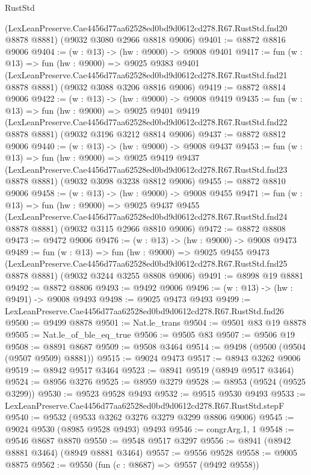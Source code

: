 \begin{lexlean}{RustStd}
\begin{coremodule}
    (LexLeanPreserve.Cae4456d77aa62528ed0bd9d0612cd278.R67.RustStd.fnd20 @8878 @8881)
    (@9032 @3080 @2966 @8818 @9006)
@9401 := @8872 @8816 @9006
@9404 := (w : @13) -> (hw : @9000) -> @9008 @9401
@9417 := fun (w : @13) =>
  fun (hw : @9000) =>
  @9025
    @9383
    @9401
    (LexLeanPreserve.Cae4456d77aa62528ed0bd9d0612cd278.R67.RustStd.fnd21 @8878 @8881)
    (@9032 @3088 @3206 @8816 @9006)
@9419 := @8872 @8814 @9006
@9422 := (w : @13) -> (hw : @9000) -> @9008 @9419
@9435 := fun (w : @13) =>
  fun (hw : @9000) =>
  @9025
    @9401
    @9419
    (LexLeanPreserve.Cae4456d77aa62528ed0bd9d0612cd278.R67.RustStd.fnd22 @8878 @8881)
    (@9032 @3196 @3212 @8814 @9006)
@9437 := @8872 @8812 @9006
@9440 := (w : @13) -> (hw : @9000) -> @9008 @9437
@9453 := fun (w : @13) =>
  fun (hw : @9000) =>
  @9025
    @9419
    @9437
    (LexLeanPreserve.Cae4456d77aa62528ed0bd9d0612cd278.R67.RustStd.fnd23 @8878 @8881)
    (@9032 @3098 @3238 @8812 @9006)
@9455 := @8872 @8810 @9006
@9458 := (w : @13) -> (hw : @9000) -> @9008 @9455
@9471 := fun (w : @13) =>
  fun (hw : @9000) =>
  @9025
    @9437
    @9455
    (LexLeanPreserve.Cae4456d77aa62528ed0bd9d0612cd278.R67.RustStd.fnd24 @8878 @8881)
    (@9032 @3115 @2966 @8810 @9006)
@9472 := @8872 @8808
@9473 := @9472 @9006
@9476 := (w : @13) -> (hw : @9000) -> @9008 @9473
@9489 := fun (w : @13) =>
  fun (hw : @9000) =>
  @9025
    @9455
    @9473
    (LexLeanPreserve.Cae4456d77aa62528ed0bd9d0612cd278.R67.RustStd.fnd25 @8878 @8881)
    (@9032 @3244 @3255 @8808 @9006)
@9491 := @8998 @19 @8881
@9492 := @8872 @8806
@9493 := @9492 @9006
@9496 := (w : @13) -> (hw : @9491) -> @9008 @9493
@9498 := @9025 @9473 @9493
@9499 := LexLeanPreserve.Cae4456d77aa62528ed0bd9d0612cd278.R67.RustStd.fnd26
@9500 := @9499 @8878
@9501 := Nat.le_trans
@9504 := @9501 @83 @19 @8878
@9505 := Nat.le_of_ble_eq_true
@9506 := @9505 @83
@9507 := @9506 @19
@9508 := @8891 @8687
@9509 := @9508 @3464
@9514 := @9498 (@9500 (@9504 (@9507 @9509) @8881))
@9515 := @9024 @9473
@9517 := @8943 @3262 @9006
@9519 := @8942 @9517 @3464
@9523 := @8941 @9519 (@8949 @9517 @3464)
@9524 := @8956 @3276
@9525 := @8959 @3279
@9528 := @8953 (@9524 (@9525 @3299))
@9530 := @9523 @9528 @9493
@9532 := @9515 @9530 @9493
@9533 := LexLeanPreserve.Cae4456d77aa62528ed0bd9d0612cd278.R67.RustStd.stepF
@9540 := @9532 (@9533 @3262 @3276 @3279 @3299 @8806 @9006)
@9545 := @9024 @9530 (@8985 @9528 @9493) @9493
@9546 := congrArg.{1, 1}
@9548 := @9546 @8687 @8870
@9550 := @9548 @9517 @3297
@9556 := @8941 (@8942 @8881 @3464) (@8949 @8881 @3464)
@9557 := @9556 @9528
@9558 := @9005 @8875
@9562 := @9550 (fun (c : @8687) => @9557 (@9492 @9558))

\end{coremodule}
\end{lexlean}
